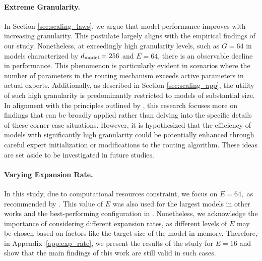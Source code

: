 \paragraph{Extreme Granularity.}
In Section \ref{sec:scaling_laws}, we argue that model performance improves with increasing granularity. This postulate largely aligns with the empirical findings of our study. Nonetheless, at exceedingly high granularity levels, such as $G=64$ in models characterized by $d_\text{model}=256$  and $E=64$, there is an observable decline in performance. This phenomenon is particularly evident in scenarios where the number of parameters in the routing mechanism exceeds active parameters in actual experts. Additionally, as described in Section \ref{sec:scaling_app}, the utility of such high granularity is predominantly restricted to models of substantial size. In alignment with the principles outlined by \cite{hoffmann2022training}, this research focuses more on findings that can be broadly applied rather than delving into the specific details of these corner-case situations. However, it is hypothesized that the efficiency of models with significantly high granularity could be potentially enhanced through careful expert initialization or modifications to the routing algorithm. These ideas are set aside to be investigated in future studies.

\paragraph{Varying Expansion Rate.}
In this study, due to computational resources constraint, we focus on $E=64,$ as recommended by \cite{clark2022unified}. This value of $E$ was also used for the largest models in other works \citep{du2022glam, zhou2022mixtureofexperts} and the best-performing configuration in \cite{fedus2022switch}. Nonetheless, we acknowledge the importance of considering different expansion rates, as different levels of $E$ may be chosen based on factors like the target size of the model in memory. Therefore, in Appendix~\ref{app:exp_rate}, we present the results of the study for $E=16$ and show that the main findings of this work are still valid in such cases. 

